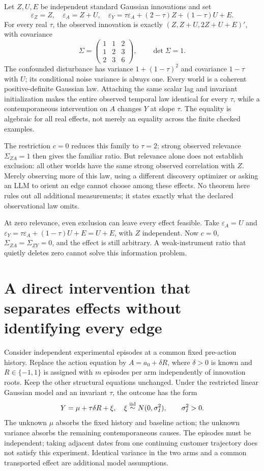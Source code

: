 Let \(Z,U,E\) be independent standard Gaussian innovations and set \[
 \varepsilon_Z=Z,\quad \varepsilon_A=Z+U,\quad
 \varepsilon_Y=\tau\varepsilon_A+(2-\tau)Z+(1-\tau)U+E.
\] For every real \(\tau\), the observed innovation is exactly
\((Z,Z+U,2Z+U+E)'\), with covariance \[
 \Sigma=\begin{pmatrix}1&1&2\\1&2&3\\2&3&6\end{pmatrix},
 \qquad\det\Sigma=1.
\] The confounded disturbance has variance \(1+(1-\tau)^2\) and
covariance \(1-\tau\) with \(U\); its conditional noise variance is
always one. Every world is a coherent positive-definite Gaussian law.
Attaching the same scalar lag and invariant initialization makes the
entire observed temporal law identical for every \(\tau\), while a
contemporaneous intervention on \(A\) changes \(Y\) at slope \(\tau\).
The equality is algebraic for all real effects, not merely an equality
across the finite checked examples.

The restriction \(c=0\) reduces this family to \(\tau=2\); strong
observed relevance \(\Sigma_{ZA}=1\) then gives the familiar ratio. But
relevance alone does not establish exclusion: all other worlds have the
same strong observed correlation with \(Z\). Merely observing more of
this law, using a different discovery optimizer or asking an LLM to
orient an edge cannot choose among these effects. No theorem here rules
out all additional measurements; it states exactly what the declared
observational law omits.

At zero relevance, even exclusion can leave every effect feasible. Take
\(\varepsilon_A=U\) and
\(\varepsilon_Y=\tau\varepsilon_A+(1-\tau)U+E=U+E\), with \(Z\)
independent. Now \(c=0\), \(\Sigma_{ZA}=\Sigma_{ZY}=0\), and the effect
is still arbitrary. A weak-instrument ratio that quietly deletes zero
cannot solve this information problem.

\hypertarget{a-direct-intervention-that-separates-effects-without-identifying-every-edge}{%
\section{A direct intervention that separates effects without
identifying every
edge}\label{a-direct-intervention-that-separates-effects-without-identifying-every-edge}}

Consider independent experimental episodes at a common fixed pre-action
history. Replace the action equation by \(A=a_0+\delta R\), where
\(\delta>0\) is known and \(R\in\{-1,1\}\) is assigned with \(m\)
episodes per arm independently of innovation roots. Keep the other
structural equations unchanged. Under the restricted linear Gaussian
model and an invariant \(\tau\), the outcome has the form \[
 Y=\mu+\tau\delta R+\xi,\quad
 \xi\mathrel{\mathop\sim^{\rm iid}}N(0,\sigma_I^2),\qquad \sigma_I^2>0.
\] The unknown \(\mu\) absorbs the fixed history and baseline action;
the unknown variance absorbs the remaining contemporaneous causes. The
episodes must be independent; taking adjacent dates from one continuing
customer trajectory does not satisfy this experiment. Identical variance
in the two arms and a common transported effect are additional model
assumptions.

